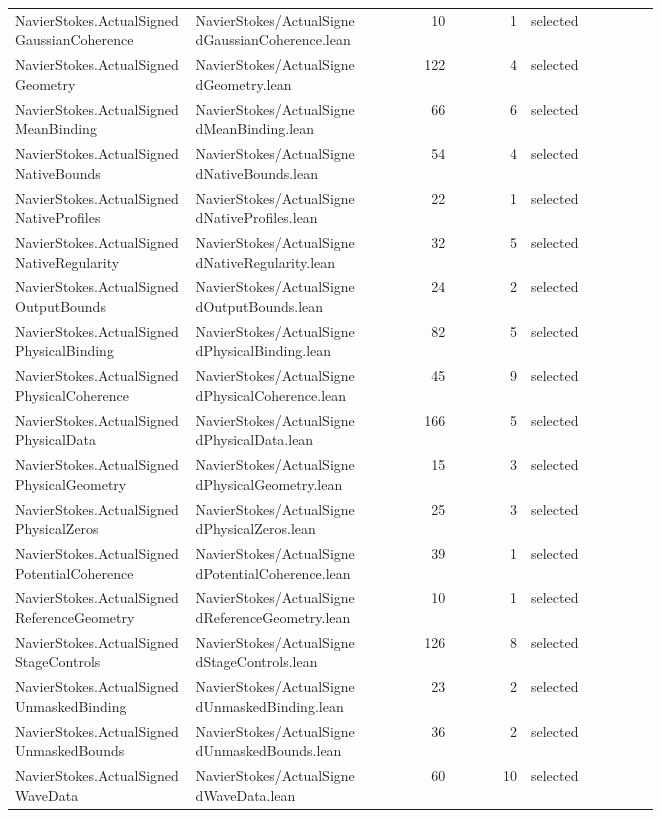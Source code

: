 \documentclass[10pt]{article}
\begin{document}
\begin{longtable}{p{0.28\linewidth}p{0.27\linewidth}r r p{0.20\linewidth}}
NavierStokes.ActualSignedGaussianCoherence & NavierStokes/ActualSignedGaussianCoherence.lean & 10 & 1 & selected\\
NavierStokes.ActualSignedGeometry & NavierStokes/ActualSignedGeometry.lean & 122 & 4 & selected\\
NavierStokes.ActualSignedMeanBinding & NavierStokes/ActualSignedMeanBinding.lean & 66 & 6 & selected\\
NavierStokes.ActualSignedNativeBounds & NavierStokes/ActualSignedNativeBounds.lean & 54 & 4 & selected\\
NavierStokes.ActualSignedNativeProfiles & NavierStokes/ActualSignedNativeProfiles.lean & 22 & 1 & selected\\
NavierStokes.ActualSignedNativeRegularity & NavierStokes/ActualSignedNativeRegularity.lean & 32 & 5 & selected\\
NavierStokes.ActualSignedOutputBounds & NavierStokes/ActualSignedOutputBounds.lean & 24 & 2 & selected\\
NavierStokes.ActualSignedPhysicalBinding & NavierStokes/ActualSignedPhysicalBinding.lean & 82 & 5 & selected\\
NavierStokes.ActualSignedPhysicalCoherence & NavierStokes/ActualSignedPhysicalCoherence.lean & 45 & 9 & selected\\
NavierStokes.ActualSignedPhysicalData & NavierStokes/ActualSignedPhysicalData.lean & 166 & 5 & selected\\
NavierStokes.ActualSignedPhysicalGeometry & NavierStokes/ActualSignedPhysicalGeometry.lean & 15 & 3 & selected\\
NavierStokes.ActualSignedPhysicalZeros & NavierStokes/ActualSignedPhysicalZeros.lean & 25 & 3 & selected\\
NavierStokes.ActualSignedPotentialCoherence & NavierStokes/ActualSignedPotentialCoherence.lean & 39 & 1 & selected\\
NavierStokes.ActualSignedReferenceGeometry & NavierStokes/ActualSignedReferenceGeometry.lean & 10 & 1 & selected\\
NavierStokes.ActualSignedStageControls & NavierStokes/ActualSignedStageControls.lean & 126 & 8 & selected\\
NavierStokes.ActualSignedUnmaskedBinding & NavierStokes/ActualSignedUnmaskedBinding.lean & 23 & 2 & selected\\
NavierStokes.ActualSignedUnmaskedBounds & NavierStokes/ActualSignedUnmaskedBounds.lean & 36 & 2 & selected\\
NavierStokes.ActualSignedWaveData & NavierStokes/ActualSignedWaveData.lean & 60 & 10 & selected\\

\end{longtable}
\end{document}
